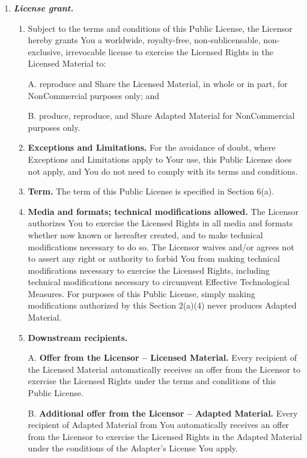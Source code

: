 \documentclass[]{book}
\begin{document}
\begin{enumerate}
\def\labelenumi{\alph{enumi}.}
\item
  \textbf{\emph{License grant.}}

  \begin{enumerate}
  \def\labelenumii{\arabic{enumii}.}
  \item
    Subject to the terms and conditions of this Public License, the Licensor hereby grants You a worldwide, royalty-free, non-sublicensable, non-exclusive, irrevocable license to exercise the Licensed Rights in the Licensed Material to:

    A. reproduce and Share the Licensed Material, in whole or in part, for NonCommercial purposes only; and

    B. produce, reproduce, and Share Adapted Material for NonCommercial purposes only.
  \item
    \textbf{Exceptions and Limitations.} For the avoidance of doubt, where Exceptions and Limitations apply to Your use, this Public License does not apply, and You do not need to comply with its terms and conditions.
  \item
    \textbf{Term.} The term of this Public License is specified in Section 6(a).
  \item
    \textbf{Media and formats; technical modifications allowed.} The Licensor authorizes You to exercise the Licensed Rights in all media and formats whether now known or hereafter created, and to make technical modifications necessary to do so. The Licensor waives and/or agrees not to assert any right or authority to forbid You from making technical modifications necessary to exercise the Licensed Rights, including technical modifications necessary to circumvent Effective Technological Measures. For purposes of this Public License, simply making modifications authorized by this Section 2(a)(4) never produces Adapted Material.
  \item
    \textbf{Downstream recipients.}

    A. \textbf{Offer from the Licensor -- Licensed Material.} Every recipient of the Licensed Material automatically receives an offer from the Licensor to exercise the Licensed Rights under the terms and conditions of this Public License.

    B. \textbf{Additional offer from the Licensor -- Adapted Material.} Every recipient of Adapted Material from You automatically receives an offer from the Licensor to exercise the Licensed Rights in the Adapted Material under the conditions of the Adapter's License You apply.


\end{enumerate}
\end{enumerate}
\end{document}
